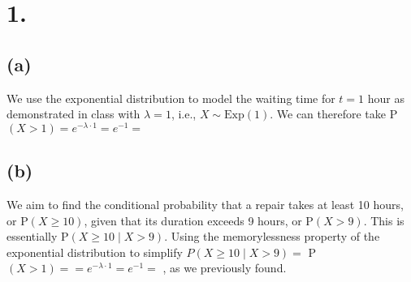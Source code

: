 \documentclass{article}
\begin{document}
\thispagestyle{firstpageheader}

\section*{1.}
{\Large 

\subsection*{(a)}
We use the exponential distribution to model the waiting time for $t = 1$ hour as demonstrated in class with $\lambda = 1$, i.e., $X \sim \text{Exp}(1)$. We can therefore take P$(X > 1) = e^{-\lambda \cdot 1} = e^{-1} = $ 

\subsection*{(b)}
We aim to find the conditional probability that a repair takes at least 10 hours, or P$(X \geq 10)$, given that its duration exceeds 9 hours, or P$(X > 9)$. This is essentially P$(X \geq 10 \mid X > 9)$. 
Using the memorylessness property of the exponential distribution to simplify $P(X \geq 10 \mid X > 9) = $ P$(X > 1) = = e^{-\lambda \cdot 1} = e^{-1} = $ , as we previously found.

}
\end{document}
